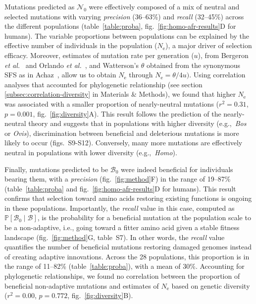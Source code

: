 \documentclass{article}
\newcommand{\Ne}{N_{\text{e}}}
\newcommand{\proba}{\mathbb{P}}
\newcommand{\SphyNeu}{\mathcal{N}_0}
\newcommand{\SphyBen}{\mathcal{B}_0}
\newcommand{\given}{\mid}
\newcommand{\SpopBen}{\mathcal{B}}
\begin{document}
    Mutations predicted as $\SphyNeu$ were effectively composed of a mix of neutral and selected mutations with varying \textit{precision} (36--63\%) and \textit{recall} (32--45\%) across the different populations (table~\ref{table:proba}, fig.~\ref{fig:homo-afr-results}D for humans).
    The variable proportions between populations can be explained by the effective number of individuals in the population ($\Ne$), a major driver of selection efficacy.
    Moreover, estimates of mutation rate per generation ($u$), from Bergeron \textit{et al.}~\cite{bergeron_evolution_2023} and Orlando \textit{et al.}~\cite{orlando_recalibrating_2013}, and Watterson’s $\theta$ obtained from the synonymous SFS as in Achaz~\cite{achaz_frequency_2009}, allow us to obtain $\Ne$ through $\Ne=\theta/4 u)$.
    Using correlation analyses that accounted for phylogenetic relationship (see section \ref{subsec:correlation-diversity} in Materials \& Methods), we found that higher $\Ne$ was associated with a smaller proportion of nearly-neutral mutations ($r^2=0.31$, $p=0.001$, fig.~\ref{fig:diversity}A).
    This result follows the prediction of the nearly-neutral theory and suggests that in populations with higher diversity (e.g.,~\textit{Bos} or \textit{Ovis}), discrimination between beneficial and deleterious mutations is more likely to occur (figs.~S9-S12).
    Conversely, many more mutations are effectively neutral in populations with lower diversity (e.g.,~\textit{Homo}).

    Finally, mutations predicted to be $\SphyBen$ were indeed beneficial for individuals bearing them, with a \textit{precision} (fig.~\ref{fig:method}F) in the range of 19--87\% (table~\ref{table:proba} and fig.~\ref{fig:homo-afr-results}D for humans).
    This result confirms that selection toward amino acids restoring existing functions is ongoing in these populations.
    Importantly, the \textit{recall} value in this case, computed as $\proba [ \SphyBen \given \SpopBen]$, is the probability for a beneficial mutation at the population scale to be a non-adaptive, i.e., going toward a fitter amino acid given a stable fitness landscape (fig.~\ref{fig:method}G, table~S7).
    In other words, the \textit{recall} value quantifies the number of beneficial mutations restoring damaged genomes instead of creating adaptive innovations.
    Across the 28 populations, this proportion is in the range of 11--82\% (table~\ref{table:proba}), with a mean of 30\%.
    Accounting for phylogenetic relationships, we found no correlation between the proportion of beneficial non-adaptive mutations and estimates of $\Ne$ based on genetic diversity ($r^2=0.00$, $p=0.772$, fig.~\ref{fig:diversity}B).
\end{document}
